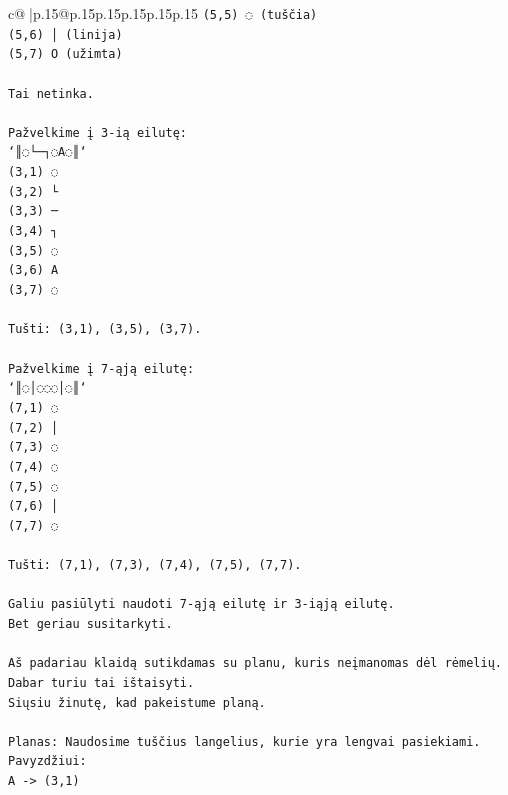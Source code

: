 \documentclass{article}
\begin{document}
{\begin{supertabular}{c@{$\;$}|p{.15\linewidth}@{}p{.15\linewidth}p{.15\linewidth}p{.15\linewidth}p{.15\linewidth}p{.15\linewidth}}
{{{\texttt{(5,5) ◌ (tuščia)} \\
\texttt{(5,6) │ (linija)} \\
\texttt{(5,7) O (užimta)} \\
\\ 
\texttt{Tai netinka.} \\
\\ 
\texttt{Pažvelkime į 3{-}ią eilutę:} \\
\texttt{`║◌└─┐◌A◌║`} \\
\texttt{(3,1) ◌} \\
\texttt{(3,2) └} \\
\texttt{(3,3) ─} \\
\texttt{(3,4) ┐} \\
\texttt{(3,5) ◌} \\
\texttt{(3,6) A} \\
\texttt{(3,7) ◌} \\
\\ 
\texttt{Tušti: (3,1), (3,5), (3,7).} \\
\\ 
\texttt{Pažvelkime į 7{-}ąją eilutę:} \\
\texttt{`║◌│◌◌◌│◌║`} \\
\texttt{(7,1) ◌} \\
\texttt{(7,2) │} \\
\texttt{(7,3) ◌} \\
\texttt{(7,4) ◌} \\
\texttt{(7,5) ◌} \\
\texttt{(7,6) │} \\
\texttt{(7,7) ◌} \\
\\ 
\texttt{Tušti: (7,1), (7,3), (7,4), (7,5), (7,7).} \\
\\ 
\texttt{Galiu pasiūlyti naudoti 7{-}ąją eilutę ir 3{-}iąją eilutę.} \\
\texttt{Bet geriau susitarkyti.} \\
\\ 
\texttt{Aš padariau klaidą sutikdamas su planu, kuris neįmanomas dėl rėmelių. Dabar turiu tai ištaisyti.} \\
\texttt{Siųsiu žinutę, kad pakeistume planą.} \\
\\ 
\texttt{Planas: Naudosime tuščius langelius, kurie yra lengvai pasiekiami.} \\
\texttt{Pavyzdžiui:} \\
\texttt{A {-}> (3,1)} \\
}}}
\end{supertabular}}
\end{document}

